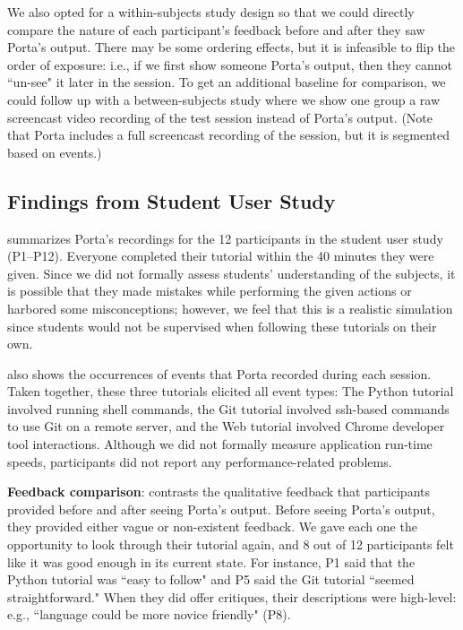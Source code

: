 We also opted for a within-subjects study design so that we could
directly compare the nature of each participant's feedback before and
after they saw Porta's output. There may be some ordering effects, but
it is infeasible to flip the order of exposure: i.e., if we first show
someone Porta's output, then they cannot ``un-see" it later in the
session. To get an additional baseline for comparison, we could follow
up with a between-subjects study where we show one group a raw
screencast video recording of the test session instead of Porta's
output. (Note that Porta includes a full screencast recording of the
session, but it is segmented based on events.)




\subsection{Findings from Student User Study}

 summarizes Porta's recordings for the 12
participants in the student user study (P1--P12). Everyone completed
their tutorial within the 40 minutes they were given. Since we did not
formally assess students' understanding of the subjects, it is possible
that they made mistakes while performing the given actions or harbored
some misconceptions; however, we feel that this is a realistic simulation
since students would not be supervised when following these tutorials on
their own.

 also shows the occurrences of events that Porta
recorded during each session. Taken together, these three tutorials elicited all
event types: The Python tutorial involved running shell
commands, the Git tutorial involved ssh-based commands to use Git on
a remote server, and the Web tutorial involved Chrome developer tool
interactions.
%
Although we did not formally measure application run-time speeds,
participants did not report any performance-related problems.

\textbf{Feedback comparison}:  contrasts
the qualitative feedback that participants provided before and after
seeing Porta's output.
%
Before seeing Porta's output, they provided either vague or non-existent
feedback. We gave each one the opportunity to look through their
tutorial again, and 8 out of 12 participants felt like it was good
enough in its current state. For instance, P1 said that the Python
tutorial was ``easy to follow" and P5 said the Git tutorial ``seemed
straightforward." When they did offer critiques, their descriptions were
high-level: e.g., ``language could be more novice friendly" (P8).

